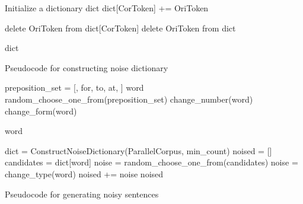 \documentclass[11pt,a4paper]{article}
\begin{document}
\begin{algorithm*}
\begin{algorithmic}
\State Initialize a dictionary dict
    \State dict[CorToken] += OriToken
\EndFor

            \State delete OriToken from dict[CorToken]
        \EndIf
    \EndFor
        \State delete OriToken from dict
    \EndIf
\EndFor

\Return dict
\EndFunction
\caption{Pseudocode for constructing noise dictionary}
\label{alg:constructing}
\end{algorithmic}
\end{algorithm*}

\begin{algorithm*}
\begin{algorithmic}
    \State preposition\_set = [, for, to, at, ]
        \Return word
    \Else
            \State random\_choose\_one\_from(preposition\_set)
         change\_number(word)
         change\_form(word)
        \EndIf
    \EndIf
    
    \Return word
\EndFunction

    \State dict = ConstructNoiseDictionary(ParallelCorpus, min\_count)
    \State noised = []
            \State candidates = dict[word]
            \State noise = random\_choose\_one\_from(candidates)
        \Else
            \State noise = change\_type(word)
        \EndIf
        \State noised += noise
    \EndFor
    \Return noised
\EndFunction

\caption{Pseudocode for generating noisy sentences}
\label{alg:noising}
\end{algorithmic}
\end{algorithm*}
\end{document}
